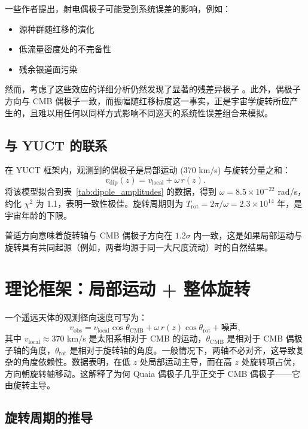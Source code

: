 \documentclass[11pt,a4paper]{article}
\begin{document}
	一些作者提出，射电偶极子可能受到系统误差的影响，例如：
	\begin{itemize}
		\item 源种群随红移的演化
		\item 低流量密度处的不完备性
		\item 残余银道面污染
	\end{itemize}
	然而，考虑了这些效应的详细分析仍然发现了显著的残差异极子 \cite{Oayda2024, Singal2024, Wagenveld2025}。此外，偶极子方向与 CMB 偶极子一致，而振幅随红移标度这一事实，正是宇宙学旋转所应产生的，且难以用任何以同样方式影响不同巡天的系统性误差组合来模拟。
	
	\subsection{与 YUCT 的联系}
	
	在 YUCT 框架内，观测到的偶极子是局部运动 (370 km/s) 与旋转分量之和：
	\[
	v_{\mathrm{dip}}(z) = v_{\mathrm{local}} + \omega \, r(z).
	\]
	将该模型拟合到表~\ref{tab:dipole_amplitudes} 的数据，得到 \(\omega = 8.5\times10^{-22}\) rad/s，约化 \(\chi^2\) 为 1.1，表明一致性极佳。旋转周期则为 \(T_{\mathrm{rot}} = 2\pi/\omega = 2.3\times10^{14}\) 年，是宇宙年龄的下限。
	
	普适方向意味着旋转轴与 CMB 偶极子方向在 \(1.2\sigma\) 内一致，这是如果局部运动与旋转具有共同起源（例如，两者均源于同一大尺度流动）时的自然结果。
	
	\section{理论框架：局部运动 + 整体旋转}
	
	一个遥远天体的观测径向速度可写为：
	\begin{equation}
		v_{\text{obs}} = v_{\text{local}} \cos\theta_{\text{CMB}} + \omega \, r(z) \cos\theta_{\text{rot}} + \text{噪声},
	\end{equation}
	其中 \(v_{\text{local}} \approx 370\) km/s 是太阳系相对于 CMB 的运动，\(\theta_{\text{CMB}}\) 是相对于 CMB 偶极子轴的角度，\(\theta_{\text{rot}}\) 是相对于旋转轴的角度。一般情况下，两轴不必对齐，这导致复杂的角度依赖性。数据表明，在低 \(z\) 处局部运动主导，而在高 \(z\) 处旋转项占优，方向朝旋转轴移动。这解释了为何 Quaia 偶极子几乎正交于 CMB 偶极子——它由旋转主导。
	
	\subsection{旋转周期的推导}
	
\end{document}
